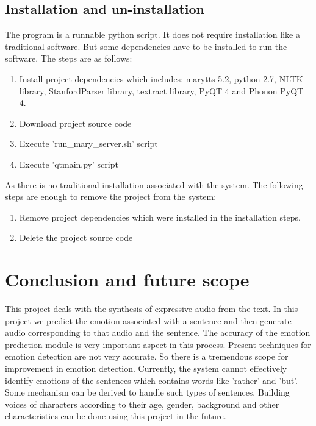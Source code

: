 \documentclass[oneside,a4paper,12pt]{book}
\begin{document}
     \section{Installation and un-installation}
     The program is a runnable python script. It does not require installation like a traditional software. But some dependencies have to be installed to run the software. The steps are as follows:
     \begin{enumerate}
     	\item Install project dependencies which includes: marytts-5.2, python 2.7, NLTK library, StanfordParser library, textract library, PyQT 4 and Phonon PyQT 4.
     	\item Download project source code
     	\item Execute 'run\_mary\_server.sh' script
     	\item Execute 'qtmain.py' script
     \end{enumerate}
     As there is no traditional installation associated with the system. The following steps are enough to remove the project from the system:
     \begin{enumerate}
     	\item Remove project dependencies which were installed in the installation steps.
     	\item Delete the project source code
     \end{enumerate}
 \chapter{Conclusion and future scope}
This project deals with the synthesis of expressive audio from the text. In this project we predict the emotion associated with a sentence and then generate audio corresponding to that audio and the sentence. The accuracy of the emotion prediction module is very important aspect in this process. Present techniques for emotion detection are not very accurate. So there is a tremendous scope for improvement in emotion detection. Currently, the system cannot effectively identify emotions of the sentences which contains words like 'rather' and 'but'. Some mechanism can be derived to handle such types of sentences. Building voices of characters according to their age, gender, background and other characteristics can be done using this project in the future.

% 



\end{document}
